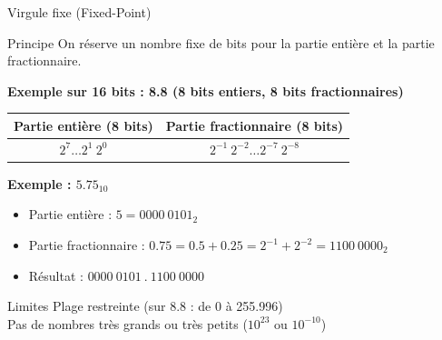 \documentclass[aspectratio=1610]{beamer}
\begin{document}
\begin{frame}{Virgule fixe (Fixed-Point)}

  \begin{block}{Principe}
    On réserve un nombre fixe de bits pour la partie entière et la partie fractionnaire.
  \end{block}

  \vspace{0.3cm}

  \textbf{Exemple sur 16 bits : 8.8 (8 bits entiers, 8 bits fractionnaires)}

  \begin{center}
    \begin{tabular}{|c|c|}
      \hline
      \textbf{Partie entière (8 bits)} & \textbf{Partie fractionnaire (8 bits)} \\
      \hline
      $2^7 \ldots 2^1\ 2^0$ & $2^{-1}\ 2^{-2} \ldots 2^{-7}\ 2^{-8}$ \\
      \hline
    \end{tabular}
  \end{center}

  \vspace{0.3cm}

  \textbf{Exemple : $5.75_{10}$}

  \begin{itemize}
    \pause
    \item Partie entière : $5 = 0000\ 0101_2$
    \pause
    \item Partie fractionnaire : $0.75 = 0.5 + 0.25 = 2^{-1} + 2^{-2} = 1100\ 0000_2$
    \pause
    \item Résultat : $0000\ 0101\ .\ 1100\ 0000$
  \end{itemize}


  \begin{alertblock}{Limites}
     Plage restreinte (sur 8.8 : de 0 à 255.996) \\
     Pas de nombres très grands ou très petits ($10^{23}$ ou $10^{-10}$)
  \end{alertblock}

\end{frame}
\end{document}
